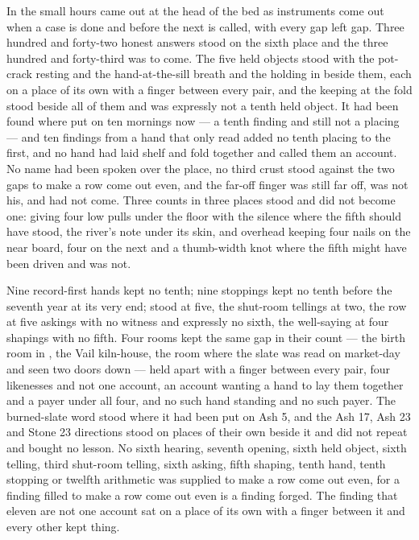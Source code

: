 In the small hours  came out at the head of the bed as instruments come out when a case is done and before the next is called, with every gap left gap. Three hundred and forty-two honest answers stood on the sixth place and the three hundred and forty-third was to come. The five held objects stood with the pot-crack resting and the hand-at-the-sill breath and the holding in  beside them, each on a place of its own with a finger between every pair, and the keeping at the fold stood beside all of them and was expressly not a tenth held object. It had been found where put on ten mornings now --- a tenth finding and still not a placing --- and ten findings from a hand that only read added no tenth placing to the first, and no hand had laid shelf and fold together and called them an account. No name had been spoken over the place, no third crust stood against the two gaps to make a row come out even, and the far-off finger was still far off, was not his, and had not come. Three counts in three places stood and did not become one:  giving four low pulls under the floor with the silence where the fifth should have stood, the river's note under its skin, and  overhead keeping four nails on the near board, four on the next and a thumb-width knot where the fifth might have been driven and was not.

Nine record-first hands kept no tenth; nine stoppings kept no tenth before the seventh year at its very end;  stood at five, the shut-room tellings at two, the row at five askings with no witness and expressly no sixth, the well-saying at four shapings with no fifth. Four rooms kept the same gap in their count --- the birth room in , the Vail kiln-house, the room where the slate was read on market-day and  seen two doors down --- held apart with a finger between every pair, four likenesses and not one account, an account wanting a hand to lay them together and a payer under all four, and no such hand standing and no such payer. The burned-slate word stood where it had been put on Ash 5, and the Ash 17, Ash 23 and Stone 23 directions stood on places of their own beside it and did not repeat and bought no lesson. No sixth hearing, seventh opening, sixth held object, sixth telling, third shut-room telling, sixth asking, fifth shaping, tenth hand, tenth stopping or twelfth arithmetic was supplied to make a row come out even, for a finding filled to make a row come out even is a finding forged. The finding that eleven are not one account sat on a place of its own with a finger between it and every other kept thing.

